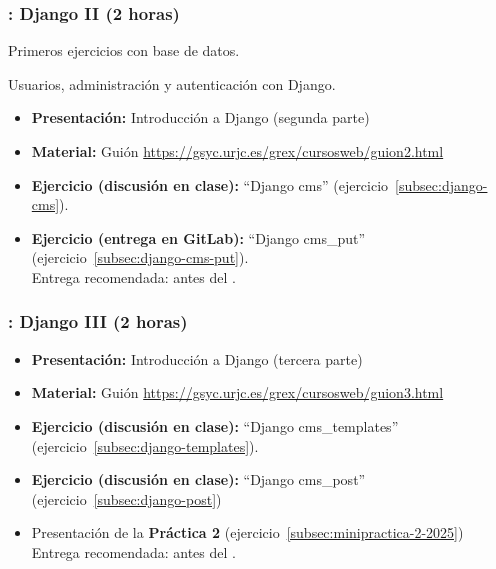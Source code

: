 \documentclass[a4paper,12pt]{article}
\begin{document}
\subsubsection{\juevesH: Django II (2 horas)}
\label{cal:juevesH}

Primeros ejercicios con base de datos.

Usuarios, administración y autenticación con Django.

\begin{itemize}
 \item \textbf{Presentación:} Introducción a Django (segunda parte)
  \item \textbf{Material:} Guión \url{https://gsyc.urjc.es/grex/cursosweb/guion2.html}
 \item \textbf{Ejercicio  (discusión en clase):} ``Django cms'' (ejercicio~\ref{subsec:django-cms}). \\
 \item \textbf{Ejercicio (entrega en GitLab):} ``Django cms\_put'' (ejercicio~\ref{subsec:django-cms-put}). \\
  Entrega recomendada: antes del \juevesI.
\end{itemize}

\subsubsection{\juevesI: Django III (2 horas)}
\label{cal:juevesI}

\begin{itemize}
 \item \textbf{Presentación:} Introducción a Django (tercera parte)
  \item \textbf{Material:} Guión \url{https://gsyc.urjc.es/grex/cursosweb/guion3.html}
 \item \textbf{Ejercicio (discusión en clase):} ``Django cms\_templates'' (ejercicio~\ref{subsec:django-templates}).
 \item \textbf{Ejercicio (discusión en clase):} ``Django cms\_post'' (ejercicio~\ref{subsec:django-post}) \\
  \item Presentación de la \textbf{Práctica 2} (ejercicio~\ref{subsec:minipractica-2-2025}) \\
  Entrega recomendada: antes del \juevesK.
\end{itemize}
\end{document}
